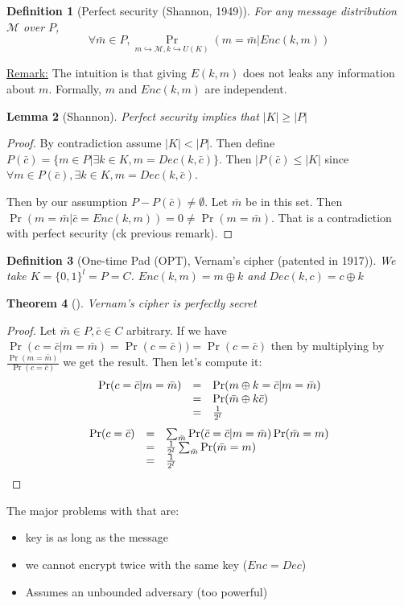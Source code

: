 \documentclass{article}
\newtheorem{thm}{Theorem}[section]
\newtheorem{lem}[thm]{Lemma}
\newtheorem{defi}[thm]{Definition}
\newcommand{\Thm}[3]{\begin{thm}[#1]\label{#2}#3\end{thm}}
\newcommand{\Def}[3]{\begin{defi}[#1]\label{#2}#3\end{defi}}
\newcommand{\Lem}[3]{\begin{lem}[#1]\label{#2}#3\end{lem}}
\begin{document}
\Def{Perfect security (Shannon, 1949)}{def:perfSec}{For any message distribution $\mathcal{M}$ over $P$, \[\forall \bar{m}\in P, \Pr_{m\hookrightarrow\mathcal{M}, k\hookrightarrow U(K)}(m=\bar{m}|Enc(k,m))\]}

\underline{Remark:} The intuition is that giving $E(k,m)$ does not leaks any information about $m$. Formally, $m$ and $Enc(k,m)$ are independent.

\Lem{Shannon}{}{Perfect security implies that $|K|\geq|P|$}
\begin{proof}
By contradiction assume $|K|<|P|$. Then define $P(\bar{c})=\{m\in P|\exists k\in K, m=Dec(k,\bar{c})\}$. Then $|P(\bar{c})\leq|K|$ since $\forall m\in P(\bar{c}),\exists k\in K, m=Dec(k,\bar{c})$.

Then by our assumption $P-P(\bar{c})\neq\emptyset$. Let $\bar{m}$ be in this set. Then $\Pr(m=\bar{m}|\bar{c}=Enc(k,m))=0\neq\Pr(m=\bar{m})$. That is a contradiction with perfect security (ck previous remark).
\end{proof}

\Def{One-time Pad (OPT), Vernam's cipher (patented in 1917)}{def:OTP}{We take $K=\{0,1\}^l=P=C$. $Enc(k,m) = m\oplus k$ and $Dec(k,c)=c\oplus k$}

\Thm{}{thm:OPTPerfect}{Vernam's cipher is perfectly secret}
\begin{proof}
Let $\bar{m}\in P, \bar{c}\in C$ arbitrary. If we have $\Pr(c=\bar{c}|m=\bar{m})=\Pr(c=\bar{c}))=\Pr(c=\bar{c})$ then by multiplying by $\frac{\Pr(m=\bar{m})}{\Pr(c=\bar{c})}$ we get the result. Then let's compute it:
\[\begin{array}{r c l}
\Pr(c=\bar{c}|m=\bar{m}) & = & \Pr(m\oplus k=\bar{c}|m=\bar{m})\\
&=&\Pr(\bar{m}\oplus k \bar{c})\\
&=&\frac{1}{2^l}
\end{array}\]
\[\begin{array}{r c l}
\Pr(c=\bar{c}) & = & \sum_{\bar{m}}\Pr(\bar{c}=\bar{c}|m=\bar{m})\Pr(\bar{m}=m)\\
&=&\frac{1}{2^l}\sum_{\bar{m}}\Pr(\bar{m}=m)\\
&=&\frac{1}{2^l}
\end{array}\]
\end{proof}

The major problems with that are:
\begin{itemize}
\item key is as long as the message
\item we cannot encrypt twice with the same key ($Enc=Dec$)
\item Assumes an unbounded adversary (too powerful)
\end{itemize}
\end{document}
